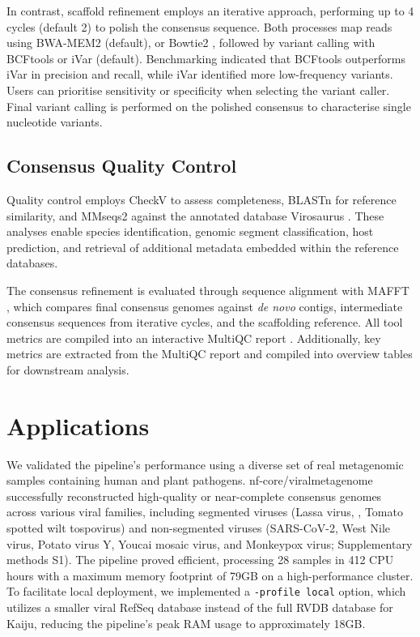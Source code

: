 In contrast, scaffold refinement employs an iterative approach, performing up to 4 cycles (default 2) to polish the consensus sequence. Both processes map reads using BWA-MEM2 \citep{Vasimuddin2019-rb} (default), or Bowtie2 \citep{Langmead2019-wx}, followed by variant calling with BCFtools \citep{Danecek2021-je} or iVar \citep{Grubaugh2019-xd} (default). Benchmarking \citep{Bassano2022-cl} indicated that BCFtools outperforms iVar in precision and recall, while iVar identified more low-frequency variants. Users can prioritise sensitivity or specificity when selecting the variant caller. Final variant calling is performed on the polished consensus to characterise single nucleotide variants.

\subsection{Consensus Quality Control}
Quality control employs CheckV \citep{Nayfach2021-wl} to assess completeness, BLASTn \citep{Altschul1990-sy} for reference similarity, and MMseqs2 \citep{Steinegger2017-ci} against the annotated database Virosaurus \citep{Gleizes2020-rq}. These analyses enable species identification, genomic segment classification, host prediction, and retrieval of additional metadata embedded within the reference databases.

The consensus refinement is evaluated through sequence alignment with MAFFT \citep{Katoh2002-ox}, which compares final consensus genomes against \textit{de novo} contigs, intermediate consensus sequences from iterative cycles, and the scaffolding reference. All tool metrics are compiled into an interactive MultiQC report \citep{Ewels2016-hs}. Additionally, key metrics are extracted from the MultiQC report and compiled into overview tables for downstream analysis.

\section{Applications}
We validated the pipeline's performance using a diverse set of real metagenomic samples containing human and plant pathogens. nf-core/viralmetagenome successfully reconstructed high-quality or near-complete consensus genomes across various viral families, including segmented viruses (Lassa virus, , Tomato spotted wilt tospovirus) and non-segmented viruses (SARS-CoV-2, West Nile virus, Potato virus Y, Youcai mosaic virus, and Monkeypox virus; Supplementary methods S1). The pipeline proved efficient, processing 28 samples in 412 CPU hours with a maximum memory footprint of 79GB on a high-performance cluster. To facilitate local deployment, we implemented a \texttt{-profile local} option, which utilizes a smaller viral RefSeq database instead of the full RVDB database for Kaiju, reducing the pipeline's peak RAM usage to approximately 18GB.

